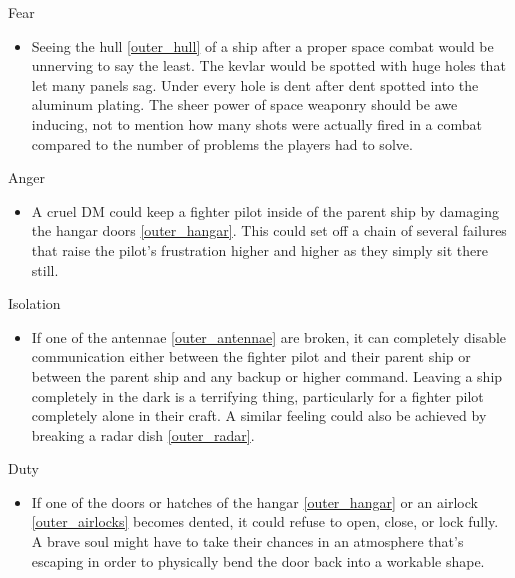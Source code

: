 \documentclass[a4paper]{article}
\begin{document}
\vspace{0.3cm}
\begin{minipage}[t]{0.4\linewidth}
Fear
\begin{itemize}
\item Seeing the hull \ref{outer_hull} of a ship after a proper space combat would be unnerving to say the least. The kevlar would be spotted with huge holes that let many panels sag. Under every hole is dent after dent spotted into the aluminum plating. The sheer power of space weaponry should be awe inducing, not to mention how many shots were actually fired in a combat compared to the number of problems the players had to solve.
\end{itemize}
\end{minipage} 
\begin{minipage}[t]{0.4\linewidth}
Anger
\begin{itemize}
\item A cruel DM could keep a fighter pilot inside of the parent ship by damaging the hangar doors \ref{outer_hangar}. This could set off a chain of several failures that raise the pilot's frustration higher and higher as they simply sit there still.
\end{itemize}
\end{minipage}

\begin{minipage}[t]{0.4\linewidth}
Isolation
\begin{itemize}
\item If one of the antennae \ref{outer_antennae} are broken, it can completely disable communication either between the fighter pilot and their parent ship or between the parent ship and any backup or higher command. Leaving a ship completely in the dark is a terrifying thing, particularly for a fighter pilot completely alone in their craft. A similar feeling could also be achieved by breaking a radar dish \ref{outer_radar}. 
\end{itemize}
\end{minipage}
\begin{minipage}[t]{0.4\linewidth}
Duty
\begin{itemize}
\item If one of the doors or hatches of the hangar \ref{outer_hangar} or an airlock \ref{outer_airlocks} becomes dented, it could refuse to open, close, or lock fully. A brave soul might have to take their chances in an atmosphere that's escaping in order to physically bend the door back into a workable shape.
\end{itemize}
\end{minipage}
\end{document}
